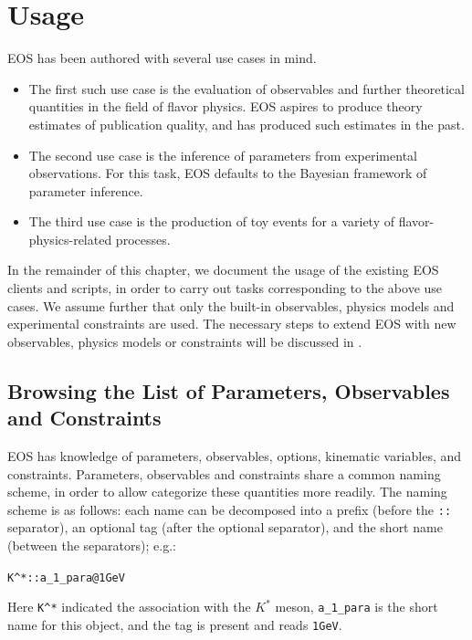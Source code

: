 
\chapter{Usage}
\label{ch:usage}

EOS has been authored with several use cases in mind.
\begin{itemize}
\item The first such use case is the evaluation of observables and further
theoretical quantities in the field of flavor physics. EOS aspires to produce
theory estimates of publication quality, and has produced such estimates in the
past.

\item The second use case is the inference of parameters from experimental
observations.  For this task, EOS defaults to the Bayesian framework of
parameter inference.

\item The third use case is the production of toy events for a variety of
flavor-physics-related processes.
\end{itemize}

In the remainder of this chapter, we document the usage of the existing EOS
clients and scripts, in order to carry out tasks corresponding to the above use
cases.  We assume further that only the built-in observables, physics models
and experimental constraints are used. The necessary steps to extend EOS with
new observables, physics models or constraints will be discussed in .


\section{Browsing the List of Parameters, Observables and Constraints}
\label{sec:usage:parameters+observables+constraints}

EOS has knowledge of parameters, observables, options, kinematic variables, and
constraints.  Parameters, observables and constraints share a common naming
scheme, in order to allow categorize these quantities more readily. The naming
scheme is as follows: each name can be decomposed into a prefix (before the
\texttt{::} separator), an optional tag (after the optional \texttt{\@}
separator), and the short name (between the separators); e.g.:
\begin{center}
    \verb+K^*::a_1_para@1GeV+
\end{center}
Here \texttt{K\^{}*} indicated the association with the $K^*$ meson,
\texttt{a\_1\_para} is the short name for this object, and the tag is present and
reads \texttt{1GeV}.\\

